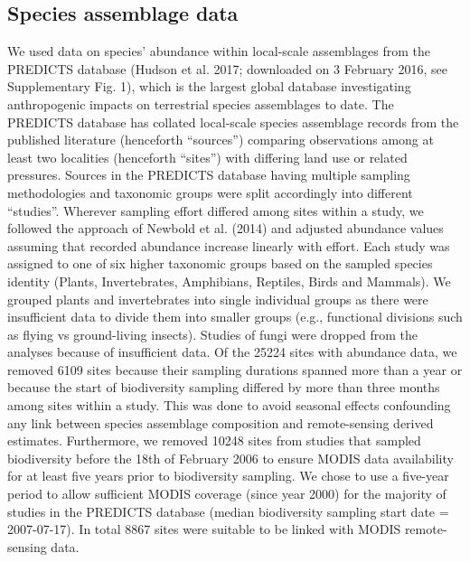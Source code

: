 \subsection{Species assemblage data}
We used data on species’ abundance within local-scale assemblages from the PREDICTS database (Hudson et al. 2017; downloaded on 3 February 2016, see Supplementary Fig. 1), which is the largest global database investigating anthropogenic impacts on terrestrial species assemblages to date. The PREDICTS database has collated local-scale species assemblage records from the published literature (henceforth “sources”) comparing observations among at least two localities (henceforth “sites”) with differing land use or related pressures. Sources in the PREDICTS database having multiple sampling methodologies and taxonomic groups were split accordingly into different “studies”. Wherever sampling effort differed among sites within a study, we followed the approach of Newbold et al. (2014) and adjusted abundance values assuming that recorded abundance increase linearly with effort. Each study was assigned to one of six higher taxonomic groups based on the sampled species identity (Plants, Invertebrates, Amphibians, Reptiles, Birds and Mammals). We grouped plants and invertebrates into single individual groups as there were insufficient data to divide them into smaller groups (e.g., functional divisions such as flying vs ground-living insects). Studies of fungi were dropped from the analyses because of insufficient data.
	Of the 25224 sites with abundance data, we removed 6109 sites because their sampling durations spanned more than a year or because the start of biodiversity sampling differed by more than three months among sites within a study. This was done to avoid seasonal effects confounding any link between species assemblage composition and remote-sensing derived estimates. Furthermore, we removed 10248 sites from studies that sampled biodiversity before the 18th of February 2006 to ensure MODIS data availability for at least five years prior to biodiversity sampling. We chose to use a five-year period to allow sufficient MODIS coverage (since year 2000) for the majority of studies in the PREDICTS database (median biodiversity sampling start date = 2007-07-17). In total 8867 sites were suitable to be linked with MODIS remote-sensing data.
